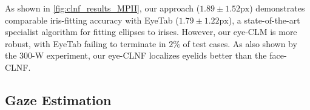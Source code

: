 As shown in \autoref{fig:clnf_results_MPII}, our approach ($1.89\!\pm\!1.52\textrm{px}$) demonstrates comparable iris-fitting accuracy with EyeTab ($1.79\!\pm\!1.22\textrm{px}$), a state-of-the-art specialist algorithm for fitting ellipses to irises. However, our eye-CLM is more robust, with EyeTab failing to terminate in $2\%$ of test cases. As also shown by the 300-W experiment, our eye-CLNF localizes eyelids better than the face-CLNF.



\subsection{Gaze Estimation}






